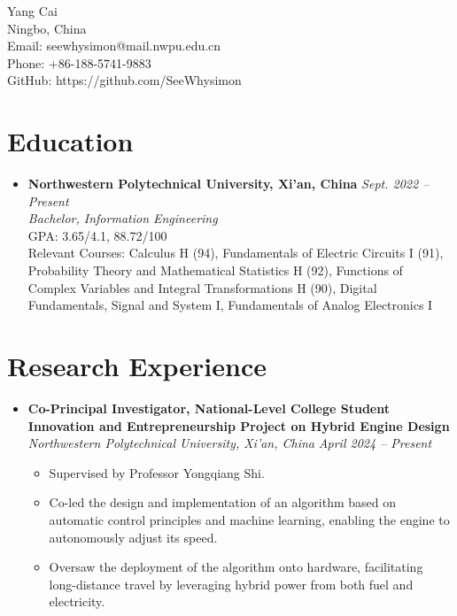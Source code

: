 \documentclass[a4paper,10pt]{article}
\begin{document}
\begin{center}
    {\LARGE Yang Cai}\\
    \vspace{0.1cm}
    Ningbo, China \\
    Email: seewhysimon@mail.nwpu.edu.cn \\
    Phone: +86-188-5741-9883 \\
    GitHub: https://github.com/SeeWhysimon
\end{center}

\section*{Education}
\begin{itemize}[leftmargin=0.5cm]
    \item \textbf{Northwestern Polytechnical University, Xi'an, China} \hfill \textit{Sept. 2022 -- Present} \\
    \textit{Bachelor, Information Engineering} \\
    GPA: 3.65/4.1, 88.72/100 \\
    Relevant Courses: Calculus H (94), 
                      Fundamentals of Electric Circuits I (91), 
                      Probability Theory and Mathematical Statistics H (92),
                      Functions of Complex Variables and Integral Transformations H (90), 
                      Digital Fundamentals, 
                      Signal and System I, 
                      Fundamentals of Analog Electronics I

\end{itemize}

\section*{Research Experience}
\begin{itemize}[leftmargin=0.5cm]
    \item \textbf{Co-Principal Investigator, National-Level College Student Innovation and Entrepreneurship Project on Hybrid Engine Design} \\
    \textit{Northwestern Polytechnical University, Xi'an, China} \hfill \textit{April 2024 -- Present} 
    
    \begin{itemize}
        \item Supervised by Professor Yongqiang Shi.
        \item Co-led the design and implementation of an algorithm based on automatic control principles and machine learning, enabling the engine to autonomously adjust its speed.
        \item Oversaw the deployment of the algorithm onto hardware, facilitating long-distance travel by leveraging hybrid power from both fuel and electricity.
    \end{itemize}
    
\end{itemize}
\end{document}
